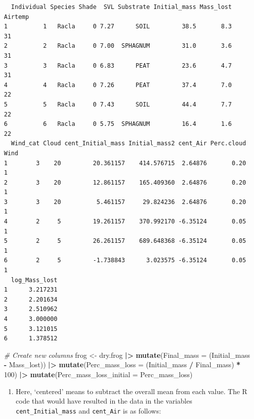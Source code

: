 \documentclass[
  10t,
]{article}
\newenvironment{Shaded}{\begin{snugshade}}{\end{snugshade}}
\newcommand{\AttributeTok}[1]{\textcolor[rgb]{0.13,0.29,0.53}{#1}}
\newcommand{\CommentTok}[1]{\textcolor[rgb]{0.56,0.35,0.01}{\textit{#1}}}
\newcommand{\DecValTok}[1]{\textcolor[rgb]{0.00,0.00,0.81}{#1}}
\newcommand{\FunctionTok}[1]{\textcolor[rgb]{0.13,0.29,0.53}{\textbf{#1}}}
\newcommand{\NormalTok}[1]{#1}
\newcommand{\OtherTok}[1]{\textcolor[rgb]{0.56,0.35,0.01}{#1}}
\newcommand{\SpecialCharTok}[1]{\textcolor[rgb]{0.81,0.36,0.00}{\textbf{#1}}}
\providecommand{\tightlist}{%
  \setlength{\itemsep}{0pt}\setlength{\parskip}{0pt}}
\let\oldtexttt\texttt
\renewcommand{\texttt}[1]{\oldtexttt{\small #1}}
\begin{document}
\begin{verbatim}
  Individual Species Shade  SVL Substrate Initial_mass Mass_lost Airtemp
1          1   Racla     0 7.27      SOIL         38.5       8.3      31
2          2   Racla     0 7.00  SPHAGNUM         31.0       3.6      31
3          3   Racla     0 6.83      PEAT         23.6       4.7      31
4          4   Racla     0 7.26      PEAT         37.4       7.0      22
5          5   Racla     0 7.43      SOIL         44.4       7.7      22
6          6   Racla     0 5.75  SPHAGNUM         16.4       1.6      22
  Wind_cat Cloud cent_Initial_mass Initial_mass2 cent_Air Perc.cloud Wind
1        3    20         20.361157    414.576715  2.64876       0.20    1
2        3    20         12.861157    165.409360  2.64876       0.20    1
3        3    20          5.461157     29.824236  2.64876       0.20    1
4        2     5         19.261157    370.992170 -6.35124       0.05    1
5        2     5         26.261157    689.648368 -6.35124       0.05    1
6        2     5         -1.738843      3.023575 -6.35124       0.05    1
  log_Mass_lost
1      3.217231
2      2.201634
3      2.510962
4      3.000000
5      3.121015
6      1.378512
\end{verbatim}

\begin{Shaded}
\begin{Highlighting}[]
\CommentTok{\# Create new columns}
\NormalTok{frog }\OtherTok{\textless{}{-}}\NormalTok{ dry.frog }\SpecialCharTok{|\textgreater{}}
  \FunctionTok{mutate}\NormalTok{(}\AttributeTok{Final\_mass =}\NormalTok{ (Initial\_mass }\SpecialCharTok{{-}}\NormalTok{ Mass\_lost)) }\SpecialCharTok{|\textgreater{}}
  \FunctionTok{mutate}\NormalTok{(}\AttributeTok{Perc\_mass\_loss =}\NormalTok{ (Initial\_mass }\SpecialCharTok{/}\NormalTok{ Final\_mass) }\SpecialCharTok{*} \DecValTok{100}\NormalTok{) }\SpecialCharTok{|\textgreater{}} 
  \FunctionTok{mutate}\NormalTok{(}\AttributeTok{Perc\_mass\_loss\_initial =}\NormalTok{ Perc\_mass\_loss) }
\end{Highlighting}
\end{Shaded}

\begin{enumerate}
\def\labelenumi{\alph{enumi}.}
\setcounter{enumi}{2}
\tightlist
\item
  Here, `centered' means to subtract the overall mean from each value.
  The R code that would have resulted in the data in the variables
  \texttt{cent\_Initial\_mass} and \texttt{cent\_Air} is as follows:
\end{enumerate}
\end{document}
